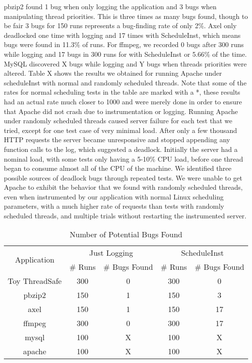 \documentclass[10pt,]{article} %
\begin{document}
pbzip2 found 1 bug when only logging the application and 3 bugs when manipulating thread priorities.  This is three times as many bugs found, though to be fair 3 bugs for 150 runs represents a bug-finding rate of only 2\%.  Axel only deadlocked one time with logging and 17 times with ScheduleInst, which means bugs were found in 11.3\% of runs.  For ffmpeg, we recorded 0 bugs after 300 runs while logging and 17 bugs in 300 runs for with ScheduleInst  or 5.66\% of the time.  MySQL discovered X bugs while logging and Y bugs when threads priorities were altered.  
Table X shows the results we obtained for running Apache under scheduleInst with normal and randomly scheduled threads. Note that some of the rates for normal scheduling tests in the table are marked with a *, these results had an actual rate much closer to 1000 and were merely done in order to ensure that Apache did not crash due to instrumentation or logging. 
Running Apache under randomly scheduled threads caused server failure for each test that we tried, except for one test case of very minimal load. After only a few thousand HTTP requests the server became unresponsive and stopped appending any function calls to the log, which suggested a deadlock. Initially the server had a nominal load, with some tests only having a 5-10\% CPU load, before one thread began to consume almost all of the CPU of the machine. We identified three possible sources of deadlock bugs through repeated tests. We were unable to get Apache to exhibit the behavior that we found with randomly scheduled threads, even when instrumented by our application with normal Linux scheduling parameters, with a much higher rate of requests than tests with randomly scheduled threads, and multiple trials without restarting the instrumented server. 
 
\begin{table}
\centering
\begin{tabular}{ |c|c|c|c|c| }
\hline
\multirow{2}{*}{Application} & \multicolumn{2}{|c|}{Just Logging} & \multicolumn{2}{|c|}{ScheduleInst} \\ \cline{2-5}
& \# Runs & \# Bugs Found & \# Runs & \# Bugs Found \\ \hline \hline
Toy ThreadSafe & 300 &0& 300 &0 \\ \hline
pbzip2 & 150 &1& 150 &3 \\ \hline
axel & 150 & 1 & 150 &17 \\ \hline
ffmpeg & 300 & 0 & 300 & 17 \\ \hline
mysql & 100 &X& 100 &X \\ \hline
apache & 100 &X& 100 &X \\ \hline

\end{tabular}
\caption{Number of Potential Bugs Found}
\label{bugsFound}
\end{table}
\end{document}
